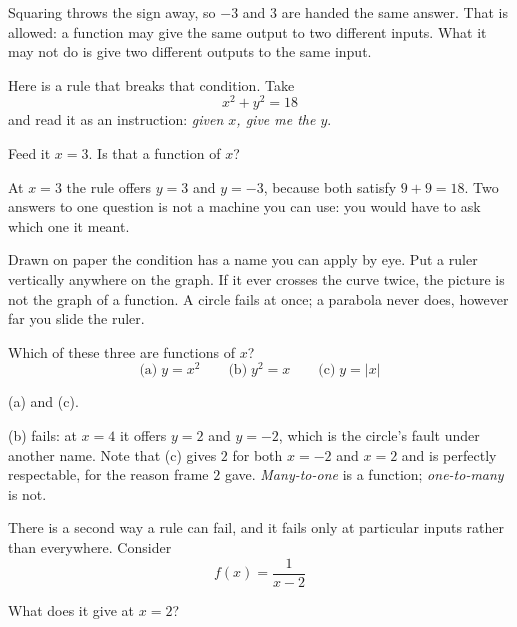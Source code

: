 \begin{fr}
Squaring throws the sign away, so $-3$ and $3$ are handed the same answer. That
is allowed: a function may give the same output to two different inputs. What
it may not do is give two different outputs to the same input.

Here is a rule that breaks that condition. Take
\[ x^{2} + y^{2} = 18 \]
and read it as an instruction: \emph{given $x$, give me the $y$}.

Feed it $x = 3$. Is that a function of $x$?
\nextframe
\end{fr}

\begin{fr}
At $x = 3$ the rule offers $y = 3$ and $y = -3$, because both satisfy
$9 + 9 = 18$. Two answers to one question is not a machine you can use: you
would have to ask which one it meant.

Drawn on paper the condition has a name you can apply by eye. Put a ruler
vertically anywhere on the graph. If it ever crosses the curve twice, the
picture is not the graph of a function. A circle fails at once; a parabola
never does, however far you slide the ruler.

Which of these three are functions of $x$?
\[ \text{(a)}\; y = x^{2} \qquad \text{(b)}\; y^{2} = x \qquad
   \text{(c)}\; y = \lvert x \rvert \]
\dotline
\nextframe
\end{fr}

\begin{fr}
\begin{ansblock}
(a) and (c).
\end{ansblock}

(b) fails: at $x = 4$ it offers $y = 2$ and $y = -2$, which is the circle's
fault under another name. Note that (c) gives $2$ for both $x = -2$ and
$x = 2$ and is perfectly respectable, for the reason frame $2$ gave.
\emph{Many-to-one} is a function; \emph{one-to-many} is not.

There is a second way a rule can fail, and it fails only at particular inputs
rather than everywhere. Consider
\[ f(x) = \frac{1}{x - 2} \]

What does it give at $x = 2$?
\nextframe
\end{fr}

